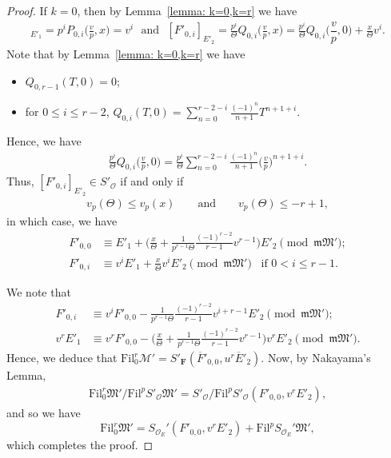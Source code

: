 \documentclass[11pt]{amsart}
\theoremstyle{definition}
\numberwithin{equation}{subsection}
\theoremstyle{plain}
\theoremstyle{plain}
\theoremstyle{plain}
\theoremstyle{plain}
\theoremstyle{plain}
\theoremstyle{plain}
\theoremstyle{plain}
\theoremstyle{plain}
\theoremstyle{plain}
\theoremstyle{plain}
\theoremstyle{plain}
\theoremstyle{plain}
\theoremstyle{definition}
\theoremstyle{definition}
\theoremstyle{definition}
\theoremstyle{remark}
\renewcommand{\(}{\textup{(}}
\renewcommand{\)}{\textup{)}}
\newcommand{\F}{\mathbf{F}}
\newcommand{\SBr}{S_{\mathcal{O}_E}}
\newcommand{\cM}{\mathcal{M}}
\newcommand{\fM}{\mathfrak{M}}
\newcommand{\fm}{\mathfrak{m}}
\newcommand{\Fil}{\mathrm{Fil}}
\newcommand{\cO}{\mathcal{O}}
\newcommand{\barE}{\overline{E}}
\newcommand{\barF}{\overline{F}}
\begin{document}
\begin{proof}
If $k=0$, then by Lemma~\ref{lemma: k=0,k=r} we have
\begin{align*}
[F'_{0,i}]_{E'_1}=p^iP_{0,i}\Big(\frac{v}{p},x\Big)
    =v^i \,\,\mbox{ and }\,\,
[F'_{0,i}]_{E'_2}=\frac{p^i}{\Theta}Q_{0,i}\Big(\frac{v}{p},x\Big)
    =\frac{p^i}{\Theta}Q_{0,i}\Big(\dfrac{v}{p},0\Big)+\frac{x}{\Theta}v^i.
\end{align*}
Note that by Lemma~\ref{lemma: k=0,k=r} we have
\begin{itemize}[leftmargin=*]
  \item $Q_{0,r-1}(T,0)=0$;
  \item for $0\leq i\leq r-2$, $Q_{0,i}(T,0)=\sum_{n=0}^{r-2-i}\frac{(-1)^n}{n+1}T^{n+1+i}$.
\end{itemize}
Hence, we have
\begin{align*}
    \frac{p^i}{\Theta}Q_{0,i}\Big(\frac{v}{p},0\Big) =\frac{p^i}{\Theta}\sum_{n=0}^{r-2-i}\frac{(-1)^n}{n+1}\Big(\frac{v}{p}\Big)^{n+1+i}.
    \end{align*}
Thus, $[F'_{0,i}]_{E'_2}\in S'_\cO$ if and only if
\begin{align*}
    v_p(\Theta)\leq v_p(x)
    \qquad\mbox{and}\qquad
    v_p(\Theta)\leq -r+1,
\end{align*}
in which case, we have
\begin{align*}
F'_{0,0}
    &\equiv
    E'_1
    +\bigg(\frac{x}{\Theta}+\frac{1}{p^{r-1}\Theta}\frac{(-1)^{r-2}}{r-1}v^{r-1}\bigg)E'_2
    \pmod{\fm\fM'};
    \\
F'_{0,i}
    &\equiv
    v^iE'_1
    +\frac{x}{\Theta}v^iE'_2
    \pmod{\fm\fM'}\,\,\,\mbox{ if }0<i\leq r-1.
\end{align*}


We note that
\begin{align*}
F'_{0,i}
    &\equiv v^iF'_{0,0}-\frac{1}{p^{r-1}\Theta}\frac{(-1)^{r-2}}{r-1}v^{i+r-1}E'_2
    \pmod{\fm\fM'};\\
v^rE'_1
    &\equiv
     v^rF'_{0,0}-\bigg(
    \frac{x}{\Theta}+\frac{1}{p^{r-1}\Theta}\frac{(-1)^{r-2}}{r-1}v^{r-1}
    \bigg)v^{r}E'_2
    \pmod{\fm\fM'}.
\end{align*}
Hence, we deduce that $\Fil^r_{0}\cM'=S'_\F(\barF'_{0,0},u^r\barE'_2)$. Now, by Nakayama's Lemma,
\begin{align*}
    \Fil^r_{0}\fM'/\Fil^p S'_\cO\fM'  = S'_\cO/\Fil^p S'_\cO(F'_{0,0},v^rE'_2),
\end{align*}
and so we have
\begin{equation}\label{eq: Nakayama}
    \Fil^r_{0}\fM'
    =\SBr'(F'_{0,0},v^rE'_2)+\Fil^p\SBr'\fM',
\end{equation}
which completes the proof.
\end{proof}
\end{document}
